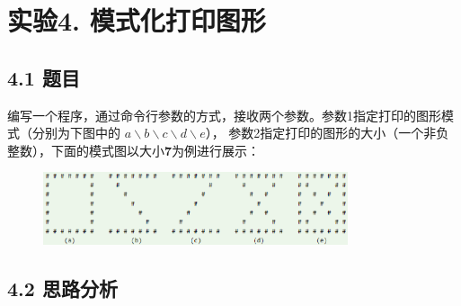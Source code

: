 \vspace{-3cm}\chapter{实验4. 模式化打印图形}

\section{4.1 题目}

编写一个程序，通过命令行参数的方式，接收两个参数。参数1指定打印的图形模式（分别为下图中的
$a\backslash b\backslash c\backslash d\backslash e$），
参数2指定打印的图形的大小（一个非负整数），下面的模式图以大小\textbf{7}为例进行展示：

\begin{figure}[H]
    \centering
    \includegraphics[width = 0.8\textwidth]{../pic/4/4.0.png}
\end{figure}

\section{4.2 思路分析}

